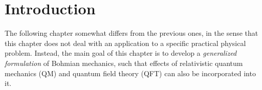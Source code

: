 \documentclass[12pt,twoside]{report} %
\begin{document}
\setcounter{secnumdepth}{3}  %
\setcounter{tocdepth}{3}         %

\tableofcontents


\newpage

\section{Introduction}\label{nikolic:sec_intro}

The following chapter somewhat differs from the previous ones, in the sense that
this chapter does not deal with an application to a specific practical physical problem.
Instead, the main goal of this chapter is to develop a {\em generalized formulation}
of Bohmian mechanics, such that effects of relativistic quantum mechanics 
(QM) and quantum field theory (QFT) can also be incorporated into it. 
\end{document}
